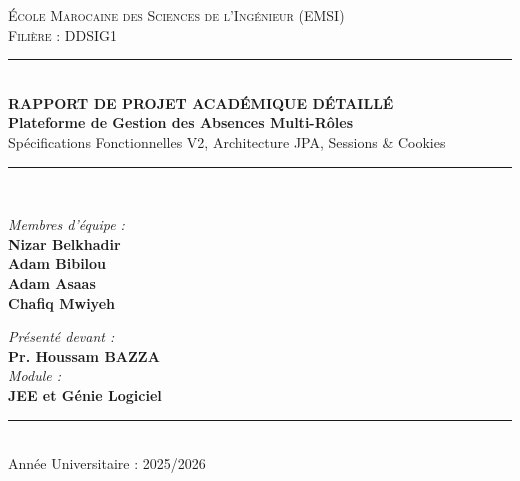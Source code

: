 \documentclass[12pt,a4paper]{article}
\begin{document}
\begin{titlepage}
    \centering
    \vspace*{1.0cm}
    
    {\scshape\LARGE École Marocaine des Sciences de l'Ingénieur (EMSI)} \\
    \vspace{0.4cm}
    {\scshape\large Filière : DDSIG1} \\
    
    \vspace{1.5cm}
    \rule{\linewidth}{0.8mm} \\
    \vspace{0.4cm}
    {\huge\bfseries RAPPORT DE PROJET ACADÉMIQUE DÉTAILLÉ \\}
    \vspace{0.4cm}
    {\Large\bfseries Plateforme de Gestion des Absences Multi-Rôles \\}
    \vspace{0.3cm}
    {\large Spécifications Fonctionnelles V2, Architecture JPA, Sessions \& Cookies} \\
    \rule{\linewidth}{0.8mm} \\
    
    \vspace{1.5cm}
    
    \begin{minipage}{0.48\textwidth}
        \begin{flushleft} \large
            \emph{Membres d'équipe :}\\
            \vspace{0.2cm}
            \textbf{Nizar Belkhadir} \\
            \textbf{Adam Bibilou} \\
            \textbf{Adam Asaas} \\
            \textbf{Chafiq Mwiyeh}
        \end{flushleft}
    \end{minipage}
    \hfill
    \begin{minipage}{0.48\textwidth}
        \begin{flushright} \large
            \emph{Présenté devant :} \\
            \vspace{0.2cm}
            \textbf{Pr. Houssam BAZZA} \\
            \vspace{0.4cm}
            \emph{Module :} \\
            \textbf{JEE et Génie Logiciel}
        \end{flushright}
    \end{minipage}
    
    \vfill
    \rule{8cm}{0.2mm} \\
    \vspace{0.2cm}
    {\large Année Universitaire : 2025/2026}
\end{titlepage}
\end{document}
